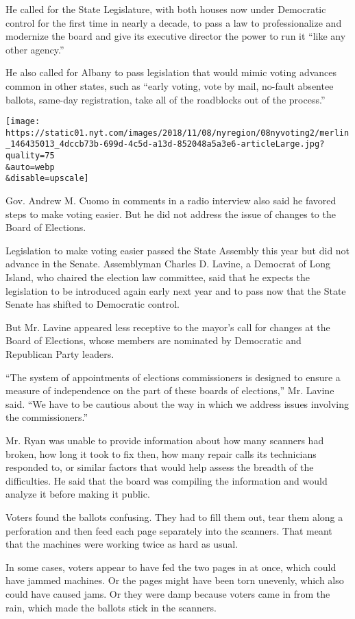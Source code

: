 He called for the State Legislature, with both houses now under
Democratic control for the first time in nearly a decade, to pass a law
to professionalize and modernize the board and give its executive
director the power to run it ``like any other agency.''

He also called for Albany to pass legislation that would mimic voting
advances common in other states, such as ``early voting, vote by mail,
no-fault absentee ballots, same-day registration, take all of the
roadblocks out of the process.''

\texttt{[image: https://static01.nyt.com/images/2018/11/08/nyregion/08nyvoting2/merlin\_146435013\_4dccb73b-699d-4c5d-a13d-852048a5a3e6-articleLarge.jpg?quality=75\\\&auto=webp\\\&disable=upscale]}

Gov. Andrew M. Cuomo in comments in a radio interview also said he
favored steps to make voting easier. But he did not address the issue of
changes to the Board of Elections.

Legislation to make voting easier passed the State Assembly this year
but did not advance in the Senate. Assemblyman Charles D. Lavine, a
Democrat of Long Island, who chaired the election law committee, said
that he expects the legislation to be introduced again early next year
and to pass now that the State Senate has shifted to Democratic control.

But Mr. Lavine appeared less receptive to the mayor's call for changes
at the Board of Elections, whose members are nominated by Democratic and
Republican Party leaders.

``The system of appointments of elections commissioners is designed to
ensure a measure of independence on the part of these boards of
elections,'' Mr. Lavine said. ``We have to be cautious about the way in
which we address issues involving the commissioners.''

Mr. Ryan was unable to provide information about how many scanners had
broken, how long it took to fix then, how many repair calls its
technicians responded to, or similar factors that would help assess the
breadth of the difficulties. He said that the board was compiling the
information and would analyze it before making it public.

Voters found the ballots confusing. They had to fill them out, tear them
along a perforation and then feed each page separately into the
scanners. That meant that the machines were working twice as hard as
usual.

In some cases, voters appear to have fed the two pages in at once, which
could have jammed machines. Or the pages might have been torn unevenly,
which also could have caused jams. Or they were damp because voters came
in from the rain, which made the ballots stick in the scanners.

